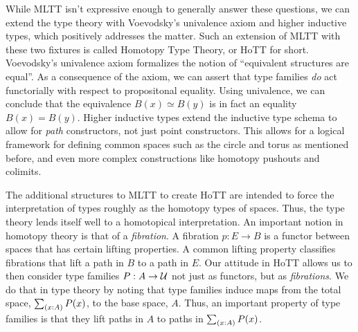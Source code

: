 \documentclass[main.tex]{subfiles}
\begin{document}
While MLTT isn't expressive enough to generally answer these questions, we can extend the type theory with Voevodsky's univalence axiom and higher inductive types, which positively addresses the matter. Such an extension of MLTT with these two fixtures is called Homotopy Type Theory, or HoTT for short. Voevodsky's univalence axiom formalizes the notion of ``equivalent structures are equal''. As a consequence of the axiom, we can assert that type families \textit{do} act functorially with respect to propositonal equality. Using univalence, we can conclude that the equivalence $B(x) \simeq B(y)$ is in fact an equality $B(x) = B(y)$. Higher inductive types extend the inductive type schema to allow for \textit{path} constructors, not just point constructors. This allows for a logical framework for defining common spaces such as the circle and torus as mentioned before, and even more complex constructions like homotopy pushouts and colimits. 

The additional structures to MLTT to create HoTT are intended to force the interpretation of types roughly as the homotopy types of spaces. Thus, the type theory lends itself well to a homotopical interpretation. An important notion in homotopy theory is that of a \textit{fibration}. A fibration $p : E \to B$ is a functor between spaces that has certain lifting properties. A common lifting property classifies fibrations that lift a path in $B$ to a path in $E$. Our attitude in HoTT allows us to then consider type families $P : A \to \mathcal{U}$ not just as functors, but as \textit{fibrations}. We do that in type theory by noting that type families induce maps from the total space, $\sm{x:A}P(x)$, to the base space, $A$. Thus, an important property of type families is that they lift paths in $A$ to paths in $\sm{x:A}P(x)$.
\end{document}
